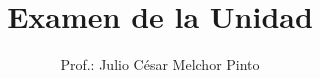 \documentclass[12pt]{evalua}
\title{Examen de la Unidad}
\author{Prof.: Julio César Melchor Pinto}
\begin{document}
\begin{multicols}{2}
    
    
    
    

\end{multicols}

\begin{questions}
    
    \newpage
    
    \newpage
    
    \begin{multicols}{2}
        
    \end{multicols}
    \newpage
    
\end{questions}
\end{document}
